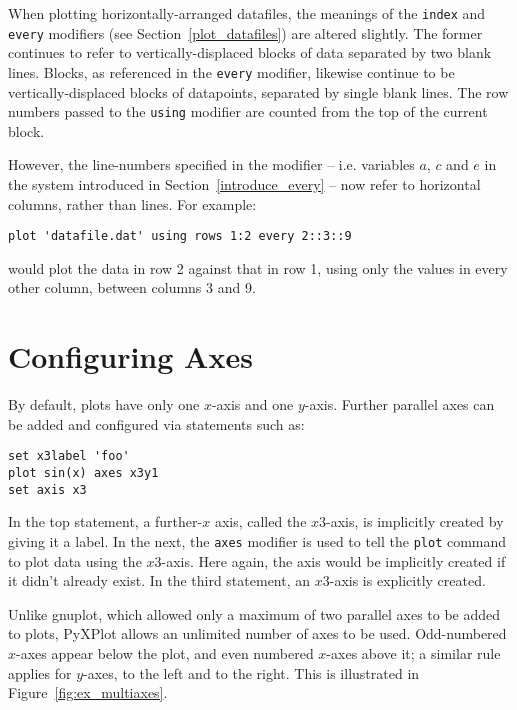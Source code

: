 When plotting horizontally-arranged datafiles, the meanings of the
{\tt index} and {\tt every} modifiers (see Section~\ref{plot_datafiles})
are altered slightly. The former continues to refer to vertically-displaced
blocks of data separated by two blank lines.  Blocks, as referenced in the
{\tt every} modifier, likewise continue to be vertically-displaced blocks of
datapoints, separated by single blank lines. The row numbers passed to the
{\tt using} modifier are counted from the top of the current block.

However, the line-numbers specified in the  modifier -- i.e.
variables $a$, $c$ and $e$ in the system introduced in
Section~\ref{introduce_every} -- now refer to horizontal columns, rather than
lines. For example:

\begin{verbatim}
plot 'datafile.dat' using rows 1:2 every 2::3::9
\end{verbatim}

\noindent would plot the data in row 2 against that in row 1, using only the
values in every other column, between columns 3 and 9.

\section{Configuring Axes}
\label{axis_extensions}\label{ranges_multiaxes}\label{multiple_axes}

By default, plots have only one $x$-axis and one $y$-axis. Further parallel
axes can be added and configured via statements such as:

\begin{verbatim}
set x3label 'foo'
plot sin(x) axes x3y1
set axis x3
\end{verbatim}

\noindent In the top statement, a further-$x$ axis, called the $x3$-axis, is
implicitly created by giving it a label. In the next, the {\tt axes}
modifier is used to tell the {\tt plot} command to plot data using the
$x3$-axis. Here again, the axis would be implicitly created if it didn't
already exist.  In the third statement, an $x3$-axis is explicitly created.

Unlike gnuplot, which allowed only a maximum of two parallel axes to be added
to plots, PyXPlot allows an unlimited number of axes to be used. Odd-numbered
$x$-axes appear below the plot, and even numbered $x$-axes above it; a similar
rule applies for $y$-axes, to the left and to the right. This is illustrated in
Figure~\ref{fig:ex_multiaxes}.


